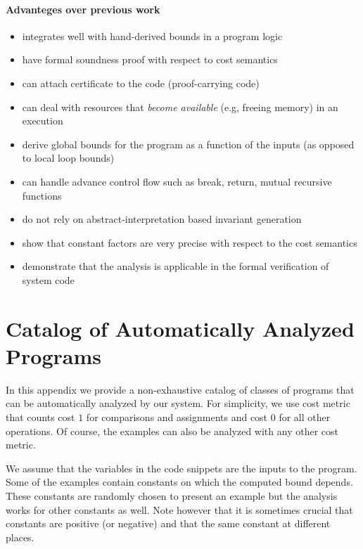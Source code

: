 \documentclass[nocopyrightspace,preprint]{sigplanconf}
\begin{document}
\paragraph{Advanteges over previous work}

\begin{itemize}
\item integrates well with hand-derived bounds in a program logic
\item have formal soundness proof with respect to cost semantics
\item can attach certificate to the code (proof-carrying code)
\item can deal with resources that \emph{become available} (e.g, freeing memory) in an execution
\item derive global bounds for the program as a function of the inputs (as opposed to local loop bounds)
\item can handle advance control flow such as break, return, mutual recursive functions
\item do not rely on abstract-interpretation based invariant generation
\item show that constant factors are very precise with respect to the cost semantics
\item demonstrate that the analysis is applicable in the formal verification of system code
\end{itemize}




\appendix

\section{Catalog of Automatically Analyzed Programs}

In this appendix we provide a non-exhaustive catalog of classes of
programs that can be automatically analyzed by our system.  For
simplicity, we use cost metric that counts cost $1$ for comparisons
and assignments and cost $0$ for all other operations.  Of course, the
examples can also be analyzed with any other cost metric.

We assume that the variables in the code snippets are the inputs to
the program. Some of the examples contain constants on which the
computed bound depends.  These constants are randomly chosen to
present an example but the analysis works for other constants as well.
Note however that it is sometimes crucial that constants are positive
(or negative) and that the same constant at different places.
\end{document}

